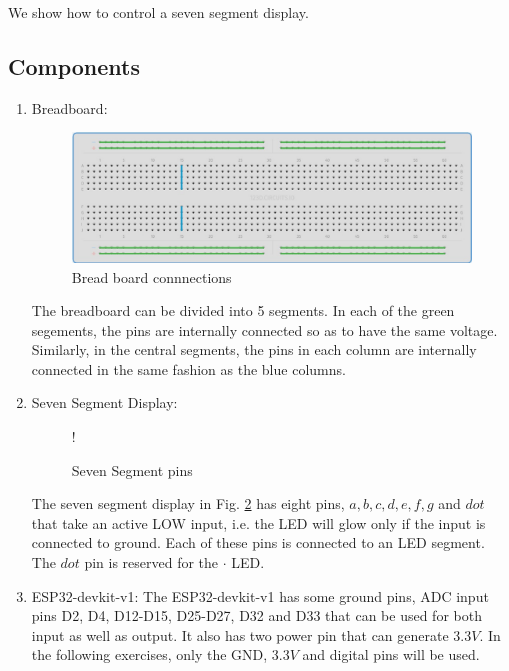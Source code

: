 We show how to control
a seven segment display.
\subsection{Components}
\begin{enumerate}[label=\arabic*.,ref=\theenumi]
\begin{table}[H]
	\centering

\caption{Components}
\label{table:components}
\end{table}
%
\item Breadboard:
\begin{figure}[H]
\begin{center}
\includegraphics[width=0.75\columnwidth]{ide/sevenseg/figs/breadboard}
\end{center}
\caption{Bread board connnections}
\label{fig:breadboard}
\end{figure}
%
The breadboard can be divided into 5 segments.  In each of the green segements, the pins are internally connected so as to have the same voltage.  Similarly, in the central segments, the pins in each column  are internally connected in the same fashion as the blue columns. 
\item Seven Segment Display:
\begin{figure}[!htb]
\begin{center}
 {!} {

}
\end{center}
\caption{Seven Segment pins}
\label{fig:sevenseg}
\end{figure}
%
The seven segment display in Fig. \ref{fig:sevenseg} has eight pins, $a, b, c, d, e, f, g$ and $dot$ that take an active LOW input, i.e.  the LED will glow only if the input is connected to ground.  Each of these pins is connected to an LED segment.  The $dot$ pin is  reserved for the $\cdot$ LED.  
%
\item ESP32-devkit-v1:
The ESP32-devkit-v1 has some ground pins, ADC input pins D2, D4, D12-D15, D25-D27, D32 and D33 that can be used for both input as well as output. It also has two power pin that can generate 3.3$V$.  In the following exercises, only the GND, 3.3$V$ and digital pins will be used.
\end{enumerate}
%
